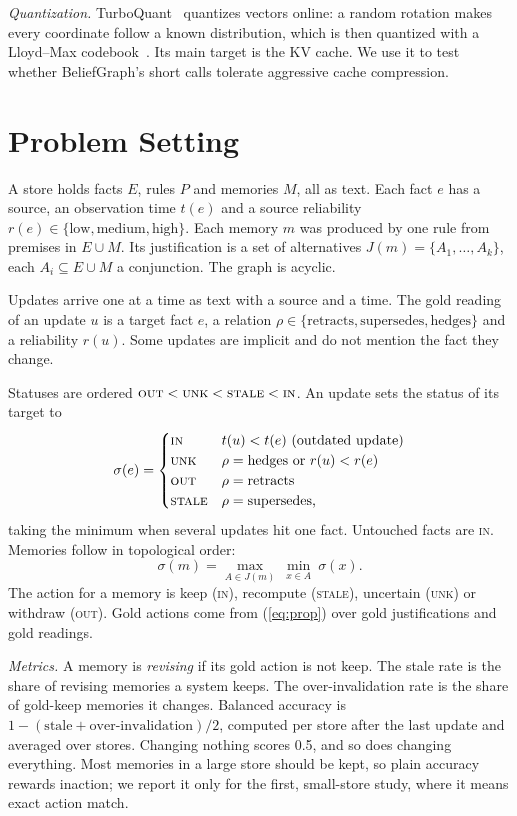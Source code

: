 \documentclass[conference]{IEEEtran}
\newcommand{\st}[1]{\textsc{#1}}
\begin{document}
\textit{Quantization.} TurboQuant~\cite{zandieh2026turboquant} quantizes vectors online: a random rotation makes every coordinate follow a known distribution, which is then quantized with a Lloyd--Max codebook~\cite{lloyd1982,max1960}. Its main target is the KV cache. We use it to test whether BeliefGraph's short calls tolerate aggressive cache compression.

\section{Problem Setting}
\label{sec:problem}

A store holds facts $E$, rules $P$ and memories $M$, all as text. Each fact $e$ has a source, an observation time $t(e)$ and a source reliability $r(e)\in\{\text{low},\text{medium},\text{high}\}$. Each memory $m$ was produced by one rule from premises in $E\cup M$. Its justification is a set of alternatives $J(m)=\{A_1,\dots,A_k\}$, each $A_i\subseteq E\cup M$ a conjunction. The graph is acyclic.

Updates arrive one at a time as text with a source and a time. The gold reading of an update $u$ is a target fact $e$, a relation $\rho\in\{\text{retracts},\text{supersedes},\text{hedges}\}$ and a reliability $r(u)$. Some updates are implicit and do not mention the fact they change.

Statuses are ordered $\st{out}<\st{unk}<\st{stale}<\st{in}$. An update sets the status of its target to
\begin{equation}
\sigma(e)=\begin{cases}
\st{in} & t(u)<t(e)\ \text{(outdated update)}\\
\st{unk} & \rho=\text{hedges or } r(u)<r(e)\\
\st{out} & \rho=\text{retracts}\\
\st{stale} & \rho=\text{supersedes,}
\end{cases}
\end{equation}
taking the minimum when several updates hit one fact. Untouched facts are \st{in}. Memories follow in topological order:
\begin{equation}
\sigma(m)=\max_{A\in J(m)}\ \min_{x\in A}\ \sigma(x).
\label{eq:prop}
\end{equation}
The action for a memory is keep (\st{in}), recompute (\st{stale}), uncertain (\st{unk}) or withdraw (\st{out}). Gold actions come from (\ref{eq:prop}) over gold justifications and gold readings.

\textit{Metrics.} A memory is \emph{revising} if its gold action is not keep. The stale rate is the share of revising memories a system keeps. The over-invalidation rate is the share of gold-keep memories it changes. Balanced accuracy is $1-(\text{stale}+\text{over-invalidation})/2$, computed per store after the last update and averaged over stores. Changing nothing scores 0.5, and so does changing everything. Most memories in a large store should be kept, so plain accuracy rewards inaction; we report it only for the first, small-store study, where it means exact action match.
\end{document}
